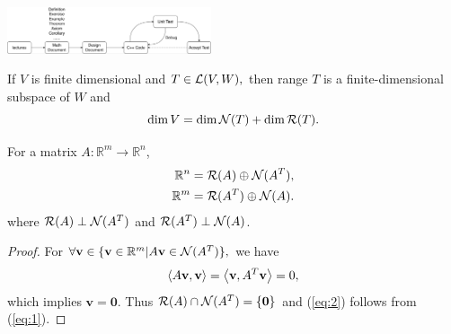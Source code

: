 \begin{center}
  \includegraphics[width=0.45\textwidth]
     {png/designPattern.png}
\end{center}
\begin{thm}
  If $V$ is finite dimensional and $T\in {\cal L}(V,W),$
  then range $T$ is a finite-dimensional subspace of $W$
  and
  \begin{equation}
    \label{eq:1}
    \dim V= \dim {\cal N}( T)+ \dim {\cal R}(T).
  \end{equation}
\end{thm}

\begin{coro}
  For a matrix $A:\mathbb{R}^m\rightarrow\mathbb{R}^n$,
  \begin{align}
    \mathbb{R}^n&={\cal R}(A)\oplus {\cal N}(A^T),\label{eq:matrix}\\
    \mathbb{R}^m&={\cal R}(A^T)\oplus {\cal N}(A).
  \end{align}
  where ${\cal R}(A)\perp {\cal N}(A^T)$ and
  ${\cal R}(A^T)\perp {\cal N}(A)$.
\end{coro}

\begin{proof}
  For $\forall \mathbf{v}\in \{\mathbf{v}\in\mathbb{R}^m
  \vert A\mathbf{v}\in {\cal N}(A^T)\},$
  we have
  \begin{equation*}
    \left\langle A\mathbf{v},\mathbf{v} \right\rangle
    =\left\langle \mathbf{v},A^T\mathbf{v} \right\rangle=0,
  \end{equation*}
  which implies $\mathbf{v}=\mathbf{0}$.
  Thus ${\cal R}(A)\cap {\cal N}(A^T)=\{\mathbf{0}\}$
  and (\ref{eq:2}) follows from (\ref{eq:1}).
\end{proof}

